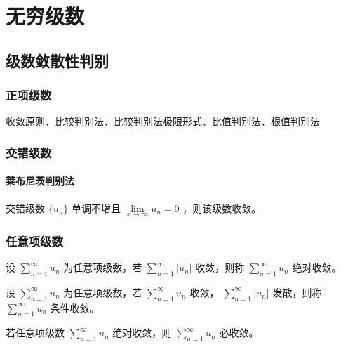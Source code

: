 ﻿\documentclass[a4paper,12pt,UTF8]{ctexart}
\begin{document}
    \section{无穷级数}

    \subsection{级数敛散性判别}

    \subsubsection{正项级数}
    收敛原则、比较判别法、比较判别法极限形式、比值判别法、根值判别法

    \subsubsection{交错级数}

    \paragraph{莱布尼茨判别法} 交错级数 \(\{u_n\}\) 单调不增且 \(\lim \limits_{x \to \infty} u_n=0\) ，则该级数收敛。

    \subsubsection{任意项级数}

    \begin{Definition}
        设 \(\sum \limits_{n=1}^{\infty} u_n\) 为任意项级数，若 \(\sum \limits_{n=1}^{\infty} |u_n|\) 收敛，则称 \(\sum \limits_{n=1}^{\infty} u_n\) 绝对收敛。
    \end{Definition}
    \begin{Definition}
        设 \(\sum \limits_{n=1}^{\infty} u_n\) 为任意项级数，若 \(\sum \limits_{n=1}^{\infty} u_n\) 收敛， \(\sum \limits_{n=1}^{\infty} |u_n|\) 发散，则称 \(\sum \limits_{n=1}^{\infty} u_n\) 条件收敛。
    \end{Definition}
    \begin{Theorem}
        若任意项级数 \(\sum \limits_{n=1}^{\infty} u_n\) 绝对收敛，则 \(\sum \limits_{n=1}^{\infty} u_n\) 必收敛。
    \end{Theorem}    
\end{document}
